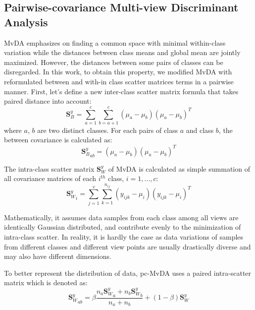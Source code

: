 
\subsection{Pairwise-covariance Multi-view Discriminant Analysis}
    MvDA emphasizes on finding a common space with minimal within-class variation while the distances between class means and global mean are jointly maximized.
    However, the distances between some pairs of classes can be disregarded.
    In this work, to obtain this property, we modified MvDA with reformulated between and with-in class scatter matrices terms in a pairwise manner.
    First, let's define a new inter-class scatter matrix formula that takes paired distance into account:
    \begin{equation}
        \boldsymbol{S}_B^y=\sum_{a=1}^{c}\sum_{b=a+1}^{c}{\left(\mu_a-\mu_b\right)\left(\mu_a-\mu_b\right)^T}
    \end{equation}
    where $a$, $b$ are two distinct classes. For each pairs of class $a$ and class $b$, the between covariance is calculated as:
    \begin{equation}
        {\boldsymbol{S}_B^y}_{ab}={\left(\mu_a-\mu_b\right)\left(\mu_a-\mu_b\right)^T}
        \label{eq:pcmvda_Sb_ab}
    \end{equation}

    The intra-class scatter matrix $\boldsymbol{S}_W^y$ of MvDA is calculated as simple summation of all covariance matrices of each $i^{th}$ class, $i = {1,...,c}$:
    \begin{equation}
        {\boldsymbol{S}_W^y}_i=\sum_{j=1}^{v}\sum_{k=1}^{n_{ij}}\left(y_{ijk}-\mu_i\right)\left(y_{ijk}-\mu_i\right)^T
        \label{eq:pcmvda_Sw_i}
    \end{equation}

    Mathematically, it assumes data samples from each class among all views are identically Gaussian distributed, and contribute evenly to the minimization of intra-class scatter.
    In reality, it is hardly the case as data variations of samples from different classes and different view points are usually drastically diverse and may also have different dimensions.

    To better represent the distribution of data, pc-MvDA uses a paired intra-scatter matrix which is denoted as:
    \begin{equation}
        {\boldsymbol{S}_W^y}_{ab}=\beta\frac{n_a{\boldsymbol{S}_W^y}_a+n_b{\boldsymbol{S}_W^y}_b}{n_a+n_b}+\left(1-\beta\right){\boldsymbol{S}_W^y}
        \label{eq:pcmvda_Sw_ab}
    \end{equation}

